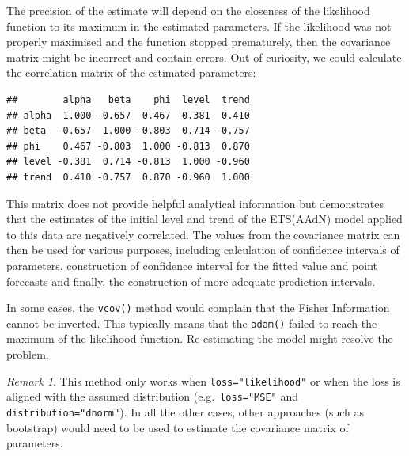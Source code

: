 \documentclass[]{book}
\newenvironment{Shaded}{\begin{snugshade}}{\end{snugshade}}
\newcommand{\DecValTok}[1]{\textcolor[rgb]{0.00,0.00,0.81}{#1}}
\newcommand{\KeywordTok}[1]{\textcolor[rgb]{0.13,0.29,0.53}{\textbf{#1}}}
\newcommand{\NormalTok}[1]{#1}
\newcommand{\OperatorTok}[1]{\textcolor[rgb]{0.81,0.36,0.00}{\textbf{#1}}}
\newcommand{\StringTok}[1]{\textcolor[rgb]{0.31,0.60,0.02}{#1}}
\theoremstyle{definition}
\theoremstyle{definition}
\theoremstyle{definition}
\theoremstyle{definition}
\theoremstyle{remark}
\newtheorem*{remark}{Remark}
\begin{document}
The precision of the estimate will depend on the closeness of the likelihood function to its maximum in the estimated parameters. If the likelihood was not properly maximised and the function stopped prematurely, then the covariance matrix might be incorrect and contain errors. Out of curiosity, we could calculate the correlation matrix of the estimated parameters:

\begin{Shaded}
\end{Shaded}

\begin{verbatim}
##        alpha   beta    phi  level  trend
## alpha  1.000 -0.657  0.467 -0.381  0.410
## beta  -0.657  1.000 -0.803  0.714 -0.757
## phi    0.467 -0.803  1.000 -0.813  0.870
## level -0.381  0.714 -0.813  1.000 -0.960
## trend  0.410 -0.757  0.870 -0.960  1.000
\end{verbatim}

This matrix does not provide helpful analytical information but demonstrates that the estimates of the initial level and trend of the ETS(AAdN) model applied to this data are negatively correlated. The values from the covariance matrix can then be used for various purposes, including calculation of confidence intervals of parameters, construction of confidence interval for the fitted value and point forecasts and finally, the construction of more adequate prediction intervals.

In some cases, the \texttt{vcov()} method would complain that the Fisher Information cannot be inverted. This typically means that the \texttt{adam()} failed to reach the maximum of the likelihood function. Re-estimating the model might resolve the problem.

\begin{remark}
This method only works when \texttt{loss="likelihood"} or when the loss is aligned with the assumed distribution (e.g.~\texttt{loss="MSE"} and \texttt{distribution="dnorm"}). In all the other cases, other approaches (such as bootstrap) would need to be used to estimate the covariance matrix of parameters.
\end{remark}
\end{document}
